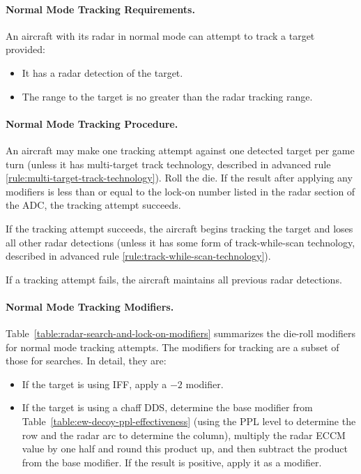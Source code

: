 {\paragraph{Normal Mode Tracking Requirements.} An aircraft with its radar in normal mode can attempt to track a target provided:
\begin{itemize}
\item It has a radar detection of the target.
\item The range to the target is no greater than the radar tracking range.
\end{itemize}

\paragraph{Normal Mode Tracking Procedure.} An aircraft may make one tracking attempt against one detected target per game turn (unless it has multi-target track technology, described in advanced rule \ref{rule:multi-target-track-technology}). Roll the die. If the result after applying any modifiers is less than or equal to the lock-on number listed in the radar section of the ADC, the tracking attempt succeeds. 

If the tracking attempt succeeds, the aircraft begins tracking the target and loses all other radar detections (unless it has some form of track-while-scan technology, described in advanced rule \ref{rule:track-while-scan-technology}).

If a tracking attempt fails, the aircraft maintains all previous radar detections.


\paragraph{Normal Mode Tracking Modifiers.} Table~\ref{table:radar-search-and-lock-on-modifiers} summarizes the die-roll modifiers for normal mode tracking attempts. The modifiers for tracking are a subset of those for searches. In detail, they are:

\begin{itemize}
    \item If the target is using IFF, apply a $-2$ modifier.

    \item If the target is using a chaff DDS, determine the base modifier from Table~\ref{table:ew-decoy-ppl-effectiveness} (using the PPL level to determine the row and the radar arc to determine the column), multiply the radar ECCM value by one half and round this product up, and then subtract the product from the base modifier. If the result is positive, apply it as a modifier.


\end{itemize}}
